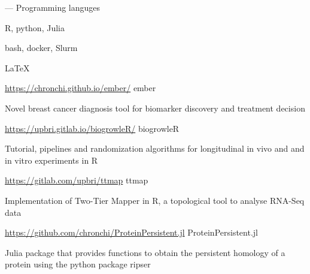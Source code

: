 

\begin{cventries}

\cventry
  {---}
  {Programming languges}
  {}{}
  {
    \begin{cvitems}
        \item {R, python, Julia}
        \item {bash, docker, Slurm}
        \item {LaTeX}
    \end{cvitems}
  }

\cventry
  {\url{https://chronchi.github.io/ember/}} %
  {ember} %
  {}{}
  {
    \begin{cvitems} %
      \item {Novel breast cancer diagnosis tool for biomarker 
             discovery and treatment decision}   
    \end{cvitems}
  }


\cventry
  {\url{https://upbri.gitlab.io/biogrowleR/}} %
  {biogrowleR} %
  {}{}
  {
    \begin{cvitems} %
      \item {Tutorial, pipelines
      and randomization algorithms for longitudinal in vivo and
      and in vitro experiments in R}
    \end{cvitems}
  }


\cventry
  {\url{https://gitlab.com/upbri/ttmap}} %
  {ttmap} %
  {}{}
  {
    \begin{cvitems} %
      \item {Implementation of Two-Tier Mapper in R, a 
             topological tool to analyse RNA-Seq data}
    \end{cvitems}
  }


\cventry
  {\url{https://github.com/chronchi/ProteinPersistent.jl}} %
  {ProteinPersistent.jl} %
  {}{}
  {
    \begin{cvitems} %
      \item {Julia package
      that provides functions to obtain the persistent homology of a
      protein using the python package ripser}
    \end{cvitems}
  }


\end{cventries}
